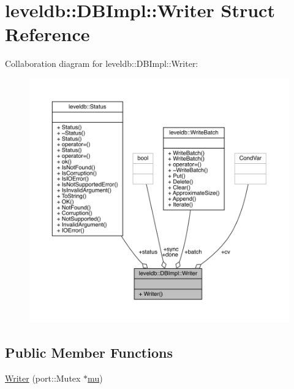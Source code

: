 \hypertarget{structleveldb_1_1_d_b_impl_1_1_writer}{}\section{leveldb\+::D\+B\+Impl\+::Writer Struct Reference}
\label{structleveldb_1_1_d_b_impl_1_1_writer}


Collaboration diagram for leveldb\+::D\+B\+Impl\+::Writer\+:
\nopagebreak
\begin{figure}[H]
\begin{center}
\leavevmode
\includegraphics[width=350pt]{structleveldb_1_1_d_b_impl_1_1_writer__coll__graph}
\end{center}
\end{figure}
\subsection*{Public Member Functions}
\begin{DoxyCompactItemize}
\item 
\mbox{\hyperlink{structleveldb_1_1_d_b_impl_1_1_writer_a7dfb43a804e1ded7a2a85b3bc756ea93}{Writer}} (port\+::\+Mutex $\ast$\mbox{\hyperlink{db__impl_8cc_a740e67d0878f1b00c462da3805e85078}{mu}})
\end{DoxyCompactItemize}
